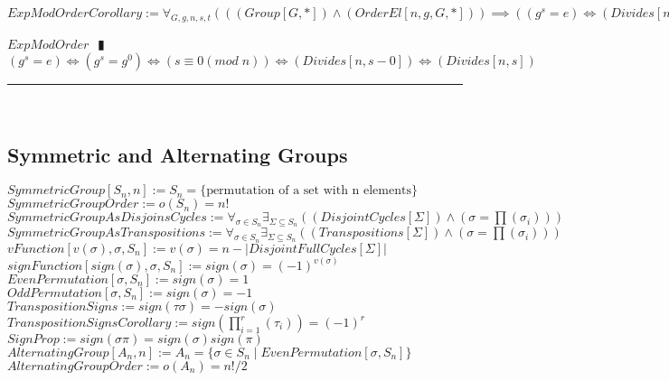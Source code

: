 \documentclass{book}
\newcommand{\abr}{:=}
\newcommand{\pipe}{$\phantom{(}\vrectangleblack\phantom{)}$}
\newcommand{\pr}[1]{\left(#1\right)}
\newcommand{\st}{\mathbin{|}}
\begin{document}
$ExpModOrderCorollary \abr \forall_{G, g, n, s, t}\pr{\pr{(Group[G, *]) \land (OrderEl[n, g, G, *])} \implies \pr{(g^s = e) \iff (Divides[n, s])}}$
\begin{enumerate}
  \lit $ExpModOrder$ \pipe $(g^s = e) \iff (g^s = g^0) \iff \pr{s \equiv 0 (mod \phantom{.} n)} \iff (Divides[n, s - 0]) \iff (Divides[n, s])$
\end{enumerate} \vspace{.75mm} \hrule \vspace{.75mm} \ \\ 


\subsection{Symmetric and Alternating Groups}
$SymmetricGroup[S_n, n] \abr S_n = \{\text{permutation of a set with n elements}\}$ \\
$SymmetricGroupOrder \abr o(S_n) = n!$ \\
$SymmetricGroupAsDisjoinsCycles \abr \forall_{\sigma \in S_n} \exists_{\Sigma \subseteq S_n}\pr{(DisjointCycles[\Sigma]) \land \pr{\sigma = \prod(\sigma_i)}}$ \\
$SymmetricGroupAsTranspositions \abr \forall_{\sigma \in S_n} \exists_{\Sigma \subseteq S_n}\pr{(Transpositions[\Sigma]) \land \pr{\sigma = \prod(\sigma_i)}}$ \\

$vFunction[v(\sigma), \sigma, S_n] \abr v(\sigma) = n - |DisjointFullCycles[\Sigma]|$ \\
$signFunction[sign(\sigma), \sigma, S_n] \abr sign(\sigma) = (-1)^{v(\sigma)}$ \\
$EvenPermutation[\sigma, S_n] \abr sign(\sigma) = 1$ \\
$OddPermutation[\sigma, S_n] \abr sign(\sigma) = -1$ \\

$TranspositionSigns \abr sign(\tau \sigma) = -sign(\sigma)$ \\
$TranspositionSignsCorollary \abr sign\pr{\prod_{i = 1}^{r}(\tau_i)} = (-1)^r$ \\
$SignProp \abr sign(\sigma \pi) = sign(\sigma) sign(\pi)$ \\

$AlternatingGroup[A_n, n] \abr A_n = \{\sigma \in S_n \st EvenPermutation[\sigma, S_n]\}$ \\
$AlternatingGroupOrder \abr o(A_n) = n!/2$ \\
\end{document}
